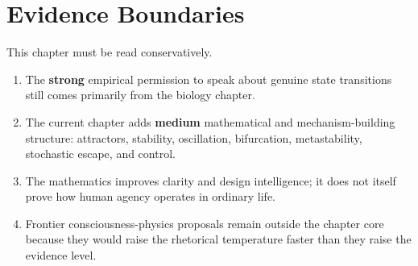 \section{Evidence Boundaries}

This chapter must be read conservatively.
\begin{enumerate}[nosep]
  \item The \textbf{strong} empirical permission to speak about genuine state
        transitions still comes primarily from the biology chapter.
  \item The current chapter adds \textbf{medium} mathematical and
        mechanism-building structure: attractors, stability, oscillation,
        bifurcation, metastability, stochastic escape, and control.
  \item The mathematics improves clarity and design intelligence; it does not
        itself prove how human agency operates in ordinary life.
  \item Frontier consciousness-physics proposals remain outside the chapter core
        because they would raise the rhetorical temperature faster than they
        raise the evidence level.
\end{enumerate}
